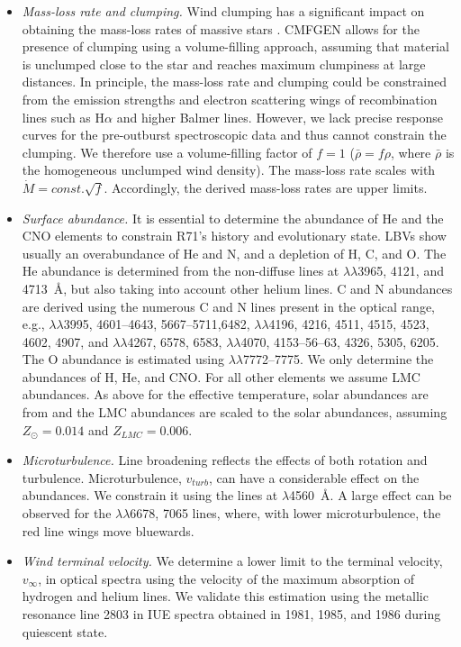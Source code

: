 \documentclass[structabstract]{aa}
\begin{document}
\begin{itemize}
\item {\it Mass-loss rate and clumping.}
Wind clumping has a significant impact on obtaining the mass-loss rates of massive stars \citep{1991A&A...247..455H,2006ApJ...637.1025F,2008A&ARv..16..209P,2013MNRAS.428.1837S,2014A&A...568A..59S}. CMFGEN allows for the presence of clumping using a volume-filling approach, assuming that material is unclumped close to the star and reaches maximum clumpiness at large distances.
In principle, the mass-loss rate and clumping could be constrained from the emission strengths and electron scattering wings of recombination lines such as H$\alpha$ and higher Balmer lines. However, we lack precise response curves for the pre-outburst spectroscopic data and thus cannot constrain the clumping. We therefore use a volume-filling factor of $f = 1$ ($\bar{\rho} = f \rho$, where $\bar{\rho}$ is the homogeneous unclumped wind density). The mass-loss rate scales with $\dot{M} = const. \sqrt{f}$. Accordingly, the derived mass-loss rates are upper limits.  

\item {\it Surface abundance.}
It is essential to determine the abundance of He and the CNO elements to constrain R71's history and evolutionary state. LBVs show usually an overabundance of He and N, and a depletion of H, C, and O. The He abundance is determined from the non-diffuse  lines at $\lambda\lambda$3965, 4121, and 4713~\AA, but also taking into account other helium lines. C and N abundances are derived using the numerous C and N lines present in the optical range, e.g.,  $\lambda\lambda$3995, 4601--4643, 5667--5711,6482,  $\lambda\lambda$4196, 4216, 4511, 4515, 4523, 4602, 4907, and   $\lambda\lambda$4267, 6578, 6583,  $\lambda\lambda$4070, 4153--56--63, 4326, 5305, 6205. 
The O abundance is estimated using  $\lambda\lambda$7772--7775.
We only determine the abundances of H, He, and CNO. For all other elements we assume LMC abundances. As above for the effective temperature, solar abundances are from \citet{2009ARA&A..47..481A} and the LMC abundances are scaled to the solar abundances, assuming  $Z_{\odot}=0.014$ and $Z_{LMC}=0.006$.

\item{\it Microturbulence.}
Line broadening reflects the effects of both rotation and turbulence. 
Microturbulence, $v_{turb}$, can have a considerable effect on the abundances. We constrain it using the  lines at $\lambda$4560~\AA. A large effect can be observed for the  $\lambda\lambda$6678, 7065 lines, where, with lower microturbulence, the red line wings move bluewards.

\item{\it Wind terminal velocity.}
We determine a lower limit to the terminal velocity, $v_{\infty}$, in optical spectra using the velocity of the maximum absorption of hydrogen and helium lines. 
We validate this estimation using the metallic resonance line  2803 in IUE spectra obtained in 1981, 1985, and 1986 during quiescent state.

\end{itemize}
\end{document}
